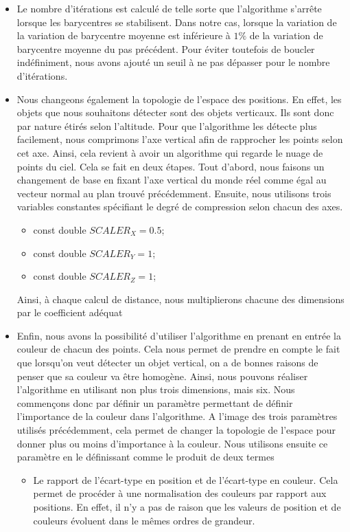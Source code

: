 \documentclass[titlepage,11pt,a4paper]{article}
\begin{document}
\begin{itemize}
\item{Le nombre d'itérations est calculé de telle sorte que l'algorithme s'arrête lorsque les barycentres se stabilisent. Dans notre cas, lorsque la variation de la variation de barycentre moyenne est inférieure à $1\%$  de la variation de barycentre moyenne du pas précédent. Pour éviter toutefois de boucler indéfiniment, nous avons ajouté un seuil à ne pas dépasser pour le nombre d'itérations.}
\item{Nous changeons également la topologie de l'espace des positions. En effet, les objets que nous souhaitons détecter sont des objets verticaux. Ils sont donc par nature étirés selon l'altitude. Pour que l'algorithme les détecte plus facilement, nous comprimons l'axe vertical afin de rapprocher les points selon cet axe. Ainsi, cela revient à avoir un algorithme qui regarde le nuage de points du ciel. Cela se fait en deux étapes. Tout d'abord, nous faisons un changement de base en fixant l'axe vertical du monde réel comme égal au vecteur normal au plan trouvé précédemment. Ensuite, nous utilisons trois variables constantes spécifiant le degré de compression selon chacun des axes.
\begin{itemize}
\item{const double $SCALER_X = 0.5$;}
\item{const double $SCALER_Y =1$;}
\item{const double $SCALER_Z = 1$;}
\end{itemize}
Ainsi, à chaque calcul de distance, nous multiplierons chacune des dimensions par le coefficient adéquat}
\item{Enfin, nous avons la possibilité d'utiliser l'algorithme en prenant en entrée la couleur de chacun des points. Cela nous permet de prendre en compte le fait que lorsqu'on veut détecter un objet vertical, on a de bonnes raisons de penser que sa couleur va être homogène. Ainsi, nous pouvons réaliser l'algorithme en utilisant non plus trois dimensions, mais six. Nous commençons donc par définir un paramètre permettant de définir l'importance de la couleur dans l'algorithme. A l'image des trois paramètres utilisés précédemment, cela permet de changer la topologie de l'espace pour donner plus ou moins d'importance à la couleur. Nous utilisons ensuite ce paramètre en le définissant comme le produit de deux termes
\begin{itemize}
\item{Le rapport de l'écart-type en position et de l'écart-type en couleur. Cela permet de procéder à une normalisation des couleurs par rapport aux positions. En effet, il n'y a pas de raison que les valeurs de position et de couleurs évoluent dans le mêmes ordres de grandeur.}

\end{itemize}}
\end{itemize}
\end{document}
